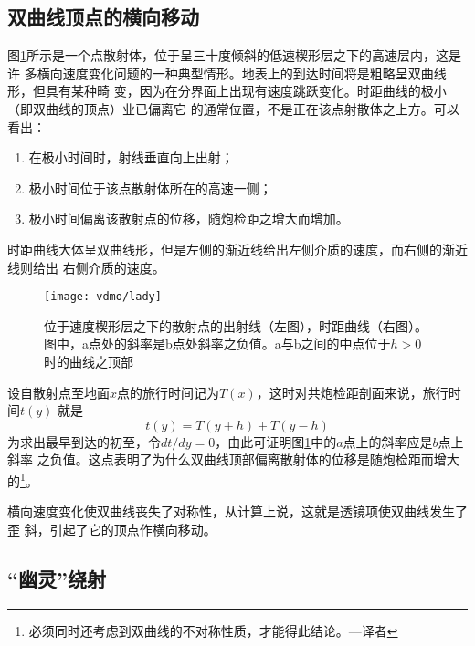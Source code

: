 \subsection{双曲线顶点的横向移动}
\label{sec:3.7.2}

图\ref{fig:vdmo/lady}所示是一个点散射体，位于呈三十度倾斜的低速楔形层之下的高速层内，这是许
多横向速度变化问题的一种典型情形。地表上的到达时间将是粗略呈双曲线形，但具有某种畸
变，因为在分界面上出现有速度跳跃变化。时距曲线的极小（即双曲线的顶点）业已偏离它
的通常位置，不是正在该点射散体之上方。可以看出：
\begin{enumerate}
  \item 在极小时间时，射线垂直向上出射；
  \item 极小时间位于该点散射体所在的高速一侧；
  \item 极小时间偏离该散射点的位移，随炮检距之增大而增加。
\end{enumerate}
时距曲线大体呈双曲线形，但是左侧的渐近线给出左侧介质的速度，而右侧的渐近线则给出
右侧介质的速度。

\begin{figure}[H]
\centering
\texttt{[image: vdmo/lady]}
\caption[lady]{位于速度楔形层之下的散射点的出射线（左图），时距曲线（右图）。
图中，a点处的斜率是b点处斜率之负值。a与b之间的中点位于$h>0$时的曲线之顶部}
\label{fig:vdmo/lady}
\end{figure}

设自散射点至地面$x$点的旅行时间记为$T(x)$，这时对共炮检距剖面来说，旅行时间$t(y)$
就是
\begin{equation*}
t(y)=T(y+h)+T(y-h)
\end{equation*}
为求出最早到达的初至，令$dt/dy=0$，由此可证明图\ref{fig:vdmo/lady}中的$a$点上的斜率应是$b$点上斜率
之负值。这点表明了为什么双曲线顶部偏离散射体的位移是随炮检距而增大的\footnote{
必须同时还考虑到双曲线的不对称性质，才能得此结论。---译者
}。

横向速度变化使双曲线丧失了对称性，从计算上说，这就是透镜项使双曲线发生了歪
斜，引起了它的顶点作横向移动。

\subsection{“幽灵”绕射}
\label{sec:3.7.3}


